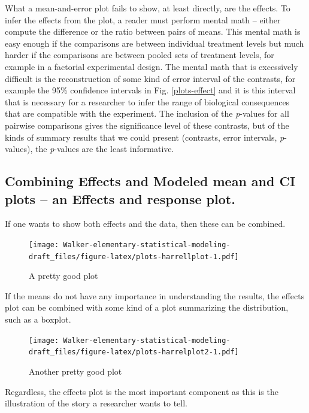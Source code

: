 \documentclass[]{book}
\begin{document}
What a mean-and-error plot fails to show, at least directly, are the effects. To infer the effects from the plot, a reader must perform mental math -- either compute the difference or the ratio between pairs of means. This mental math is easy enough if the comparisons are between individual treatment levels but much harder if the comparisons are between pooled sets of treatment levels, for example in a factorial experimental design. The mental math that is excessively difficult is the reconstruction of some kind of error interval of the contrasts, for example the 95\% confidence intervals in Fig. \ref{plots-effect} and it is this interval that is necessary for a researcher to infer the range of biological consequences that are compatible with the experiment. The inclusion of the \emph{p}-values for all pairwise comparisons gives the significance level of these contrasts, but of the kinds of summary results that we could present (contrasts, error intervals, \emph{p}-values), the \emph{p}-values are the least informative.

\hypertarget{combining-effects-and-modeled-mean-and-ci-plots-an-effects-and-response-plot.}{%
\subsection{Combining Effects and Modeled mean and CI plots -- an Effects and response plot.}\label{combining-effects-and-modeled-mean-and-ci-plots-an-effects-and-response-plot.}}

If one wants to show both effects and the data, then these can be combined.

\begin{figure}
\centering
\texttt{[image: Walker-elementary-statistical-modeling-draft\_files/figure-latex/plots-harrellplot-1.pdf]}
\caption{\label{fig:plots-harrellplot}A pretty good plot}
\end{figure}

If the means do not have any importance in understanding the results, the effects plot can be combined with some kind of a plot summarizing the distribution, such as a boxplot.

\begin{figure}
\centering
\texttt{[image: Walker-elementary-statistical-modeling-draft\_files/figure-latex/plots-harrelplot2-1.pdf]}
\caption{\label{fig:plots-harrelplot2}Another pretty good plot}
\end{figure}

Regardless, the effects plot is the most important component as this is the illustration of the story a researcher wants to tell.
\end{document}
